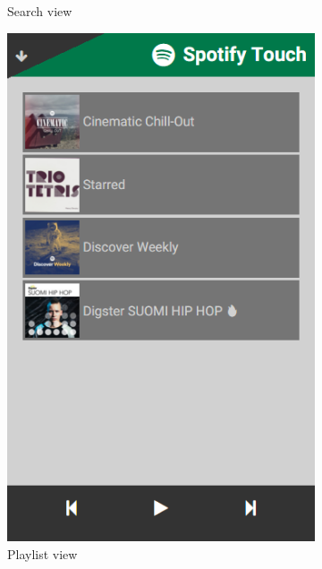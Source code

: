 \documentclass[conference]{IEEEtran}
\begin{document}
\begin{figure}[htbp]
\begin{subfigure}{0.45\columnwidth}
        \caption{Search view}
        \label{fig:SearchView}
    \end{subfigure}
    \begin{subfigure}{0.45\columnwidth}
        \centering
        \includegraphics[width=0.9\linewidth]{spotify_playlists.png}
        \caption{Playlist view}
        \label{fig:PlaylistView}
    \end{subfigure}
    \begin{subfigure}{0.45\columnwidth}
        \centering

\end{subfigure}
\end{figure}
\end{document}
